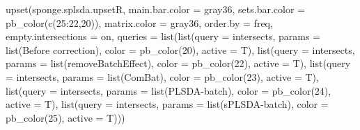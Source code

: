 \documentclass[
]{book}
\newenvironment{Shaded}{\begin{snugshade}}{\end{snugshade}}
\newcommand{\AttributeTok}[1]{\textcolor[rgb]{0.77,0.63,0.00}{#1}}
\newcommand{\DecValTok}[1]{\textcolor[rgb]{0.00,0.00,0.81}{#1}}
\newcommand{\FunctionTok}[1]{\textcolor[rgb]{0.00,0.00,0.00}{#1}}
\newcommand{\NormalTok}[1]{#1}
\newcommand{\SpecialCharTok}[1]{\textcolor[rgb]{0.00,0.00,0.00}{#1}}
\newcommand{\StringTok}[1]{\textcolor[rgb]{0.31,0.60,0.02}{#1}}
\begin{document}
\begin{Shaded}
\begin{Highlighting}[]
\FunctionTok{upset}\NormalTok{(sponge.splsda.upsetR, }\AttributeTok{main.bar.color =} \StringTok{\textquotesingle{}gray36\textquotesingle{}}\NormalTok{,}
      \AttributeTok{sets.bar.color =} \FunctionTok{pb\_color}\NormalTok{(}\FunctionTok{c}\NormalTok{(}\DecValTok{25}\SpecialCharTok{:}\DecValTok{22}\NormalTok{,}\DecValTok{20}\NormalTok{)), }\AttributeTok{matrix.color =} \StringTok{\textquotesingle{}gray36\textquotesingle{}}\NormalTok{,}
      \AttributeTok{order.by =} \StringTok{\textquotesingle{}freq\textquotesingle{}}\NormalTok{, }\AttributeTok{empty.intersections =} \StringTok{\textquotesingle{}on\textquotesingle{}}\NormalTok{,}
      \AttributeTok{queries =} 
        \FunctionTok{list}\NormalTok{(}\FunctionTok{list}\NormalTok{(}\AttributeTok{query =}\NormalTok{ intersects, }\AttributeTok{params =} \FunctionTok{list}\NormalTok{(}\StringTok{\textquotesingle{}Before correction\textquotesingle{}}\NormalTok{), }
                  \AttributeTok{color =} \FunctionTok{pb\_color}\NormalTok{(}\DecValTok{20}\NormalTok{), }\AttributeTok{active =}\NormalTok{ T),}
             \FunctionTok{list}\NormalTok{(}\AttributeTok{query =}\NormalTok{ intersects, }\AttributeTok{params =} \FunctionTok{list}\NormalTok{(}\StringTok{\textquotesingle{}removeBatchEffect\textquotesingle{}}\NormalTok{), }
                  \AttributeTok{color =} \FunctionTok{pb\_color}\NormalTok{(}\DecValTok{22}\NormalTok{), }\AttributeTok{active =}\NormalTok{ T),}
             \FunctionTok{list}\NormalTok{(}\AttributeTok{query =}\NormalTok{ intersects, }\AttributeTok{params =} \FunctionTok{list}\NormalTok{(}\StringTok{\textquotesingle{}ComBat\textquotesingle{}}\NormalTok{), }
                  \AttributeTok{color =} \FunctionTok{pb\_color}\NormalTok{(}\DecValTok{23}\NormalTok{), }\AttributeTok{active =}\NormalTok{ T),}
             \FunctionTok{list}\NormalTok{(}\AttributeTok{query =}\NormalTok{ intersects, }\AttributeTok{params =} \FunctionTok{list}\NormalTok{(}\StringTok{\textquotesingle{}PLSDA{-}batch\textquotesingle{}}\NormalTok{), }
                  \AttributeTok{color =} \FunctionTok{pb\_color}\NormalTok{(}\DecValTok{24}\NormalTok{), }\AttributeTok{active =}\NormalTok{ T),}
             \FunctionTok{list}\NormalTok{(}\AttributeTok{query =}\NormalTok{ intersects, }\AttributeTok{params =} \FunctionTok{list}\NormalTok{(}\StringTok{\textquotesingle{}sPLSDA{-}batch\textquotesingle{}}\NormalTok{), }
                  \AttributeTok{color =} \FunctionTok{pb\_color}\NormalTok{(}\DecValTok{25}\NormalTok{), }\AttributeTok{active =}\NormalTok{ T)))}
\end{Highlighting}
\end{Shaded}
\end{document}

